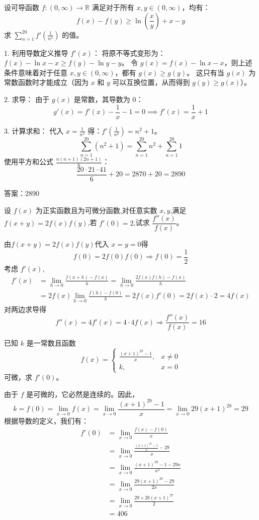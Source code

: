 \begin{questions}
\question 
设可导函数 $f : (0, \infty) \to \mathbb{R}$ 满足对于所有 $x, y \in (0, \infty)$，均有：
\[ f(x) - f(y) \geq \ln\left(\frac{x}{y}\right) + x - y \]
求 $\sum_{n=1}^{20} f'\left(\frac{1}{n^2}\right)$ 的值。

\begin{solution}
1. 利用导数定义推导 $f'(x)$：
将原不等式变形为：$f(x) - \ln x - x \geq f(y) - \ln y - y$。
令 $g(x) = f(x) - \ln x - x$，则上述条件意味着对于任意 $x, y \in (0, \infty)$，都有 $g(x) \geq g(y)$。
这只有当 $g(x)$ 为常数函数时才能成立（因为 $x$ 和 $y$ 可以互换位置，从而得到 $g(y) \geq g(x)$）。

2. 求导：
由于 $g(x)$ 是常数，其导数为 0：
\[ g'(x) = f'(x) - \frac{1}{x} - 1 = 0 \implies f'(x) = \frac{1}{x} + 1 \]

3. 计算求和：
代入 $x = \frac{1}{n^2}$ 得：$f'\left(\frac{1}{n^2}\right) = n^2 + 1$。
\[ \sum_{n=1}^{20} (n^2 + 1) = \sum_{n=1}^{20} n^2 + \sum_{n=1}^{20} 1 \]
使用平方和公式 $\frac{n(n+1)(2n+1)}{6}$：
\[ \frac{20 \cdot 21 \cdot 41}{6} + 20 = 2870 + 20 = 2890 \]

答案：2890
\end{solution}
    \question 设 $f(x)$ 为正实函数且为可微分函数,对任意实数 $x,y$,满足 $f(x+y)=2f(x)f(y)$,若 $f'(0)=2$,试求 $\dfrac{f''(x)}{f(x)}$。
    \begin{solution}
        由$f(x+y)=2f(x)f(y)$代入 $x=y=0$得
        \[
        f(0)=2f(0)f(0) \Rightarrow f(0) = \frac{1}{2}
        \]
        考虑 $f'(x)$,
        \begin{align*}
        f'(x)&=\lim_{h\to 0}\frac{f(x+h)-f(x)}{h} 
        = \lim_{h\to 0} \frac{2f(x)f(h)-f(x)}{h}  \\      
        &= 2f(x)\lim_{h\to 0} \frac{f(h)-f(0)}{h}
        = 2f(x)f'(0) = 2f(x) \cdot 2 = 4f(x)
        \end{align*}
        对两边求导得
        \[
        f''(x) = 4f'(x) = 4 \cdot 4f(x) 
        \Rightarrow \frac{f''(x)}{f(x)} = 16
        \]
    \end{solution}

    \question
已知 $k$ 是一常数且函数
\[
f(x) = \begin{cases} \frac{(x + 1)^{29} - 1}{x}, & x \neq 0 \\ k, & x = 0 \end{cases}
\]
可微，求 $f'(0)$。

\begin{solution}
由于 $f$ 是可微的，它必然是连续的。因此，
\[
k = f(0) = \lim_{x \to 0} f(x) = \lim_{x \to 0} \frac{(x + 1)^{29} - 1}{x} = \lim_{x \to 0} 29(x + 1)^{28} = 29 
\]
根据导数的定义，我们有：
\begin{align*}
f'(0) &= \lim_{x \to 0} \frac{f(x) - f(0)}{x} \\
&= \lim_{x \to 0} \frac{\frac{(x + 1)^{29} - 1}{x} - 29}{x} \\
&= \lim_{x \to 0} \frac{(x + 1)^{29} - 1 - 29x}{x^2} \\
&= \lim_{x \to 0} \frac{29(x + 1)^{28} - 29}{2x} \\
&= \lim_{x \to 0} \frac{29 \times 28(x + 1)^{27}}{2} \\
&= 406 
\end{align*}
\end{solution}


\end{questions}
